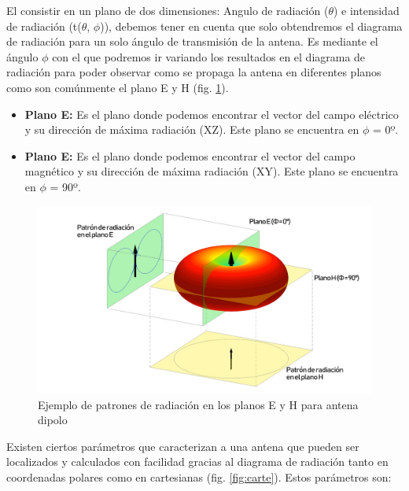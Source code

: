 \par El consistir en un plano de dos dimensiones: Angulo de radiación ($\theta$) e intensidad de radiación (t($\theta $, $\phi $)), debemos tener en cuenta que solo obtendremos el diagrama de radiación para un solo ángulo de transmisión de la antena. Es mediante el ángulo $\phi $ con el que podremos ir variando los resultados en el diagrama de radiación para poder observar como se propaga la antena en diferentes planos como son comúnmente el plano E y H (fig. \ref{fig:pattern}).

\begin{itemize}
\item \textbf{Plano E: }Es el plano donde podemos encontrar el vector del campo eléctrico y su dirección de máxima radiación (XZ). Este plano se encuentra en $\phi $ = 0º. 

\item \textbf{Plano E: }Es el plano donde podemos encontrar el vector del campo magnético y su dirección de máxima radiación (XY). Este plano se encuentra en $\phi $ = 90º.
\end{itemize}

\begin{figure}[h]
    \centering
        \includegraphics[width=15cm]{archivos/radiacion/pattern}
        \caption{Ejemplo de patrones de radiación en los planos E y H para antena dipolo}
        \label{fig:pattern}
\end{figure}

\par Existen ciertos parámetros que caracterizan a una antena que pueden ser localizados y calculados con facilidad gracias al diagrama de radiación tanto en coordenadas polares como en cartesianas (fig. \ref{fig:carte}). Estos parámetros son:

